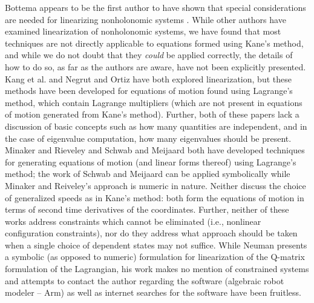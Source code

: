 \documentclass[smallcondensed,final]{svjour3}                     %
\begin{document}
Bottema appears to be the first author to have shown that special
considerations are needed for linearizing nonholonomic systems
\cite{Bottema1949}. While other authors have examined linearization of
nonholonomic systems, we have found that most techniques are not directly
applicable to equations formed using Kane's method, and while we do not doubt
that they \textit{could} be applied correctly, the details of how to do so, as
far as the authors are aware, have not been explicitly presented. Kang et al.
\cite{Kang2003} and Negrut and Ortiz \cite{Negrut2006} have both explored
linearization, but these methods have been developed for equations of motion
found using Lagrange's method, which contain Lagrange multipliers (which are
not present in equations of motion generated from Kane's method). Further, both
of these papers lack a discussion of basic concepts such as how many quantities
are independent, and in the case of eigenvalue computation, how many
eigenvalues should be present. Minaker and Rieveley \cite{Minaker2010} and
Schwab and Meijaard \cite{Schwab2003} both have developed techniques for
generating equations of motion (and linear forms thereof) using Lagrange's
method; the work of Schwab and Meijaard can be applied symbolically while
Minaker and Reiveley's approach is numeric in nature. Neither discuss the
choice of generalized speeds as in Kane's method: both form the equations of
motion in terms of second time derivatives of the coordinates.  Further,
neither of these works address constraints which cannot be eliminated (i.e.,
nonlinear configuration constraints), nor do they address what approach should
be taken when a single choice of dependent states may not suffice. While
Neuman presents a symbolic (as opposed to numeric) formulation for
linearization of the Q-matrix formulation of the Lagrangian\cite{Neuman1984},
his work makes no mention of constrained systems and attempts to contact the
author regarding the software (algebraic robot modeler -- Arm) as well as
internet searches for the software have been fruitless.

\end{document}
